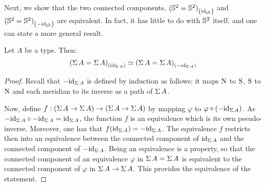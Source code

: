 \documentclass[english,a4paper]{lmcs}
\begin{document}
Next, we show that the two connected components,
${({{\mathbb S^{2}}} = {{\mathbb S^{2}}})}_{\left(\mathord{\mathrm{id}}_{{\mathbb S^{2}}}\right)}$ and
${({{\mathbb S^{2}}} = {{\mathbb S^{2}}})}_{\left(-\mathord{\mathrm{id}}_{{\mathbb S^{2}}}\right)}$ are equivalent.
In fact, it has little to do with ${{\mathbb S^{2}}}$ itself, and one can state a more
general result.
\begin{prop} \label{prop:equiv-susp-comp}
  Let $A$ be a type. Then:
  \begin{displaymath}
    {(\operatorname{\Sigma}A = \operatorname{\Sigma}A)}_{\left(\mathord{\mathrm{id}}_{\operatorname{\Sigma} A}\right)} \simeq {(\operatorname{\Sigma}A = \operatorname{\Sigma}A)}_{\left(-\mathord{\mathrm{id}}_{\operatorname{\Sigma} A}\right)}
  \end{displaymath}
  \label{prop:susp-components-are-equiv}
\end{prop}
\begin{proof}
  Recall that $-\mathord{\mathrm{id}}_{\operatorname{\Sigma} A}$ is defined by induction as follows: it maps $\mathrm{N}$
  to $\mathrm{S}$, $\mathrm{S}$ to $\mathrm{N}$ and each meridian to its inverse as a path of $\operatorname{\Sigma} A$.

  Now, define $f:{({\operatorname{\Sigma} A} \to {\operatorname{\Sigma}A})} \to ({\operatorname{\Sigma} A} \to {\operatorname{\Sigma}A})$ by mapping
  $\varphi$ to $\varphi\circ(-\mathord{\mathrm{id}}_{\operatorname{\Sigma} A})$.
  As $-\mathord{\mathrm{id}}_{\operatorname{\Sigma} A}\circ -\mathord{\mathrm{id}}_{\operatorname{\Sigma} A} = \mathord{\mathrm{id}}_{\operatorname{\Sigma} A}$, the function $f$ is
  an equivalence which is its own pseudo-inverse. Moreover, one has that
  $f(\mathord{\mathrm{id}}_{\operatorname{\Sigma} A}) = -\mathord{\mathrm{id}}_{\operatorname{\Sigma} A}$.
  The equivalence $f$ restricts then into an equivalence between the connected
  component of $\mathord{\mathrm{id}}_{\operatorname{\Sigma} A}$ and the connected component of $-\mathord{\mathrm{id}}_{\operatorname{\Sigma} A}$.
  Being an equivalence is a property, so that the connected component of an
  equivalence $\varphi$ in $\operatorname{\Sigma} A = \operatorname{\Sigma} A$ is equivalent to the connected
  component of $\varphi$ in ${\operatorname{\Sigma} A} \to {\operatorname{\Sigma}A}$. This provides the
  equivalence of the statement.
\end{proof}
\end{document}
